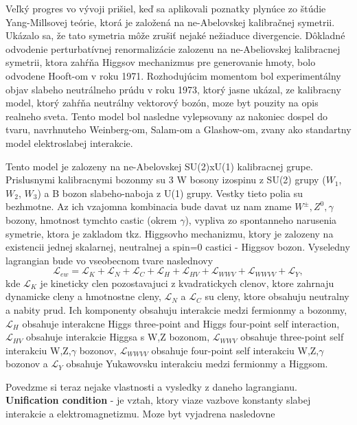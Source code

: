 \documentclass[../../main.tex]{subfiles}
\begin{document}
Veľký progres vo vývoji prišiel, keď sa aplikovali poznatky plynúce zo štúdie Yang-Millsovej teórie, ktorá je založená na ne-Abelovskej kalibračnej symetrii. Ukázalo sa, že tato symetria môže zrušiť nejaké nežiaduce divergencie. Dôkladné odvodenie perturbatívnej renormalizácie zalozenu na ne-Abeliovskej kalibracnej symetrii, ktora zahŕňa Higgsov mechanizmus pre generovanie hmoty, bolo odvodene Hooft-om v roku 1971. Rozhodujúcim momentom bol experimentálny objav slabeho neutrálneho prúdu v roku 1973, ktorý jasne ukázal, ze kalibracny model, ktorý zahŕňa neutrálny vektorový bozón, moze byt pouzity na opis realneho sveta. Tento model bol nasledne vylepsovany az nakoniec dospel do tvaru, navrhnuteho Weinberg-om, Salam-om a Glashow-om, zvany ako standartny model elektroslabej interakcie. \par
Tento model je zalozeny na ne-Abelovskej SU(2)xU(1) kalibracnej grupe. Prislusnymi kalibracnymi bozonmy su 3 W bosony izospinu z SU(2) grupy ($W_1$, $W_2$, $W_3$) a B bozon slabeho-naboja z U(1) grupy. Vestky tieto polia su bezhmotne. Az ich vzajomna kombinacia bude davat uz nam zname $W^{\pm}, Z^0, \gamma$ bozony, hmotnost tymchto castic (okrem $\gamma$), vypliva zo spontanneho narusenia symetrie, ktora je zakladom tkz. Higgsovho mechanizmu, ktory je zalozeny na existencii jednej skalarnej, neutralnej a spin=0 castici - Higgsov bozon. Vyseledny lagrangian bude vo vseobecnom tvare naslednovy
\begin{equation}
\mathcal{L}_{ew}=\mathcal{L}_{K}+\mathcal{L}_{N}+\mathcal{L}_{C}+\mathcal{L}_{H}+\mathcal{L}_{HV}+\mathcal{L}_{WWV}+\mathcal{L}_{WWVV}+\mathcal{L}_{Y},
\end{equation}
kde $\mathcal{L}_{K}$ je kineticky clen pozostavajuci z  kvadratickych clenov, ktore zahrnaju dynamicke cleny a hmotnostne cleny, $\mathcal{L}_{N}$ a $\mathcal{L}_{C}$ su cleny, ktore obsahuju neutralny a nabity prud. Ich komponenty obsahuju interakcie medzi fermionmy a bozonmy, $\mathcal{L}_{H}$ obsahuje interakcne Higgs three-point and Higgs four-point self interaction, $\mathcal{L}_{HV}$ obsahuje interakcie Higgsa s W,Z bozonom, $\mathcal{L}_{WWV}$
obsahuje three-point self interakciu W,Z,$\gamma$ bozonov, $\mathcal{L}_{WWVV}$ obsahuje four-point self interakciu W,Z,$\gamma$ bozonov a $\mathcal{L}_{Y}$ obsahuje Yukawovsku interakciu medzi fermionmy a Higgsom.\par
Povedzme si teraz nejake vlastnosti a vysledky z daneho 
lagrangianu. \textbf{Unification condition} - je vztah, ktory viaze vazbove konstanty slabej interakcie a elektromagnetizmu. Moze byt vyjadrena nasledovne 
\end{document}
